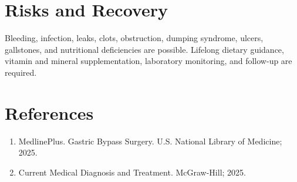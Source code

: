 \section*{Risks and Recovery}
Bleeding, infection, leaks, clots, obstruction, dumping syndrome, ulcers, gallstones, and nutritional deficiencies are possible. Lifelong dietary guidance, vitamin and mineral supplementation, laboratory monitoring, and follow-up are required.

\section*{References}
\begin{enumerate}
  \item MedlinePlus. Gastric Bypass Surgery. U.S. National Library of Medicine; 2025.
  \item Current Medical Diagnosis and Treatment. McGraw-Hill; 2025.
\end{enumerate}
\clearpage
